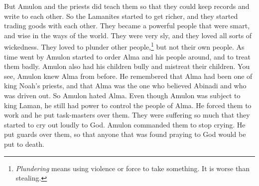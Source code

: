 \bverse \iffalse But they taught them that they should keep their record, and that they might write one to another. \fi
But Amulon and the priests did teach them so that they could keep records and write to each other.
\bverse \iffalse And thus the Lamanites began to increase in riches, and began to trade one with another and wax great, and began to be a cunning and a wise people, as to the wisdom of the world, yea, a very cunning people, delighting in all manner of wickedness and plunder, except it were among their own brethren. \fi
So the Lamanites started to get richer, and they started trading goods with each other. They became a powerful people that were smart, and wise in the ways of the world. They were very sly, and they loved all sorts of wickedness. They loved to plunder other people,\footnote{\textit{Plundering} means using violence or force to take something. It is worse than stealing.} but not their own people.
\bverse \iffalse And now it came to pass that Amulon began to exercise authority over Alma and his brethren, and began to persecute him, and cause that his children should persecute their children. \fi
As time went by Amulon started to order Alma and his people around, and to treat them badly. Amulon also had his children bully and mistreat their children.
\bverse \iffalse For Amulon knew Alma, that he had been one of the king's priests, and that it was he that believed the words of Abinadi and was driven out before the king, and therefore he was wroth with him; for he was subject to king Laman, yet he exercised authority over them, and put tasks upon them, and put task-masters over them. \fi
You see, Amulon knew Alma from before. He remembered that Alma had been one of king Noah's priests, and that Alma was the one who believed Abinadi and who was driven out. So Amulon hated Alma. Even though Amulon was subject to king Laman, he still had power to control the people of Alma. He forced them to work and he put task-masters over them.
\bverse \iffalse And it came to pass that so great were their afflictions that they began to cry mightily to God. \fi
They were suffering so much that they started to cry out loudly to God.
\bverse \iffalse And Amulon commanded them that they should stop their cries; and he put guards over them to watch them, that whosoever should be found calling upon God should be put to death. \fi
Amulon commanded them to stop crying. He put guards over them, so that anyone that was found praying to God would be put to death.
\bverse \iffalse And Alma and his people did not raise their voices to the Lord their God, but did pour out their hearts to him; and he did know the thoughts of their hearts. \fi
